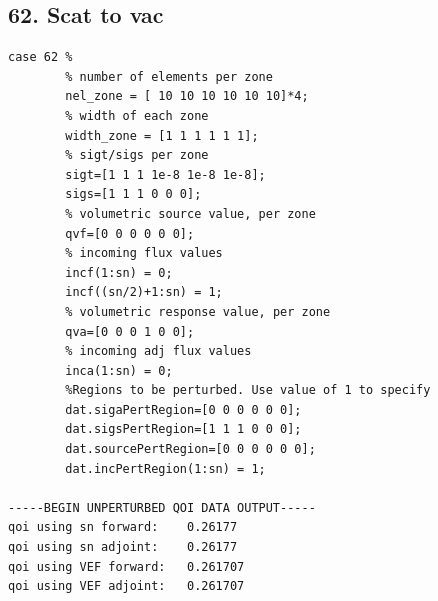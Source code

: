 \documentclass{article}
\begin{document}
\subsection{62. Scat to vac}
\begin{verbatim}
case 62 %
        % number of elements per zone
        nel_zone = [ 10 10 10 10 10 10]*4;
        % width of each zone
        width_zone = [1 1 1 1 1 1];
        % sigt/sigs per zone
        sigt=[1 1 1 1e-8 1e-8 1e-8];
        sigs=[1 1 1 0 0 0];
        % volumetric source value, per zone
        qvf=[0 0 0 0 0 0];
        % incoming flux values
        incf(1:sn) = 0;
        incf((sn/2)+1:sn) = 1;
        % volumetric response value, per zone
        qva=[0 0 0 1 0 0];
        % incoming adj flux values
        inca(1:sn) = 0;
        %Regions to be perturbed. Use value of 1 to specify
        dat.sigaPertRegion=[0 0 0 0 0 0];
        dat.sigsPertRegion=[1 1 1 0 0 0];
        dat.sourcePertRegion=[0 0 0 0 0 0];
        dat.incPertRegion(1:sn) = 1;
        
-----BEGIN UNPERTURBED QOI DATA OUTPUT----- 
qoi using sn forward: 	 0.26177 
qoi using sn adjoint: 	 0.26177 
qoi using VEF forward: 	 0.261707 
qoi using VEF adjoint: 	 0.261707 
\end{verbatim}
\end{document}
